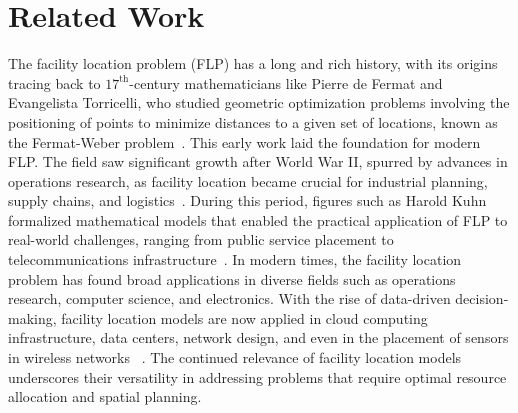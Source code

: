 \section{Related Work}
The facility location problem (FLP) has a long and rich history, with its origins tracing back to $17^{\text{th}}$-century mathematicians like Pierre de Fermat and Evangelista Torricelli, who studied geometric optimization problems involving the positioning of points to minimize distances to a given set of locations, known as the Fermat-Weber problem~\cite{drezner1995facility}. This early work laid the foundation for modern FLP. The field saw significant growth after World War II, spurred by advances in operations research, as facility location became crucial for industrial planning, supply chains, and logistics~\cite{koopmans1957assignment}. During this period, figures such as Harold Kuhn formalized mathematical models that enabled the practical application of FLP to real-world challenges, ranging from public service placement to telecommunications infrastructure~\cite{weber1909standort}.
In modern times, the facility location problem has found broad applications in diverse fields such as operations research, computer science, and electronics. With the rise of data-driven decision-making, facility location models are now applied in cloud computing infrastructure, data centers, network design, and even in the placement of sensors in wireless networks ~\cite{sl1979algorithmic}. The continued relevance of facility location models underscores their versatility in addressing problems that require optimal resource allocation and spatial planning.


